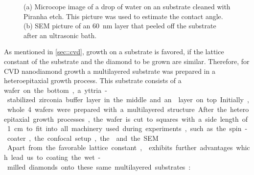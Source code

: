 \begin{figure}[tp]
	\begin{subfigure}[t]{ 0.49\linewidth}
		\caption{}\label{subfig::wetting}
		\centering
	\end{subfigure}
	\hfill
	\begin{subfigure}[t]{ 0.49\linewidth}
		\caption{}\label{subfig::peeled_ir}
		\centering
	\end{subfigure}
	\caption{(a) Microcope image of a drop of water on an \ir substrate cleaned with Piranha etch. This picture was used to estimate the contact angle. (b) SEM picture of an \SI{60}{nm} \ir layer that peeled off the substrate after an ultrasonic bath.}
	\label{fig::sem_substrates}
\end{figure}

	As mentioned in \autoref{sec::cvd}, growth on a substrate is favored, if the lattice constant of the substrate and the diamond to be grown are similar.
	Therefore, for CVD nanodiamond growth a multilayered substrate was prepared in a heteroepitaxial growth process. 
	This substrate consists of a \si wafer on the bottom, a yttria-stabilized zirconia buffer layer in the middle and an \ir layer on top. 
	Initially, whole \SI{4}{\inch} wafers were prepared with a multilayered structure.
	After the heteroepitaxial growth processes, the wafer is cut to squares with a side length of \SI{1}{cm} to fit into all machinery used during experiments, such as the spin-coater, the confocal setup, the \fib and the SEM.
	\\
	Apart from the favorable lattice constant, \ir exhibits further advantages which lead us to coating the wet-milled diamonds onto these same multilayered substrates:


